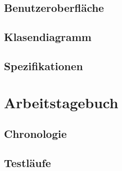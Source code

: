 \documentclass{article}
\begin{document}
\subsection{Benutzeroberfläche}
\subsection{Klasendiagramm}
\subsection{Spezifikationen}


\newpage
\section{Arbeitstagebuch}\label{section-diary}

\subsection{Chronologie}
\subsection{Testläufe}


\end{document}
